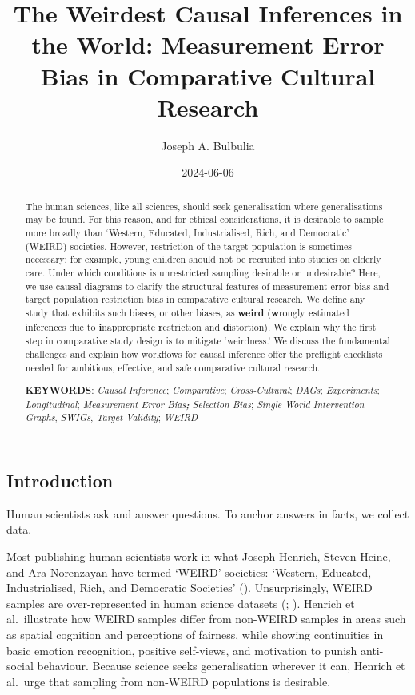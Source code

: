 \documentclass[
  single column]{article}
\title{The Weirdest Causal Inferences in the World: Measurement Error
Bias in Comparative Cultural Research}
\author{Joseph A. Bulbulia}
\affil{%
             \small{     Victoria University of Wellington, New Zealand
          ORCID \textcolor[HTML]{A6CE39}{\aiOrcid} ~0000-0002-5861-2056 }
              }
\date{2024-06-06}
\begin{document}
\maketitle
\begin{abstract}
The human sciences, like all sciences, should seek generalisation where
generalisations may be found. For this reason, and for ethical
considerations, it is desirable to sample more broadly than `Western,
Educated, Industrialised, Rich, and Democratic' (WEIRD) societies.
However, restriction of the target population is sometimes necessary;
for example, young children should not be recruited into studies on
elderly care. Under which conditions is unrestricted sampling desirable
or undesirable? Here, we use causal diagrams to clarify the structural
features of measurement error bias and target population restriction
bias in comparative cultural research. We define any study that exhibits
such biases, or other biases, as \textbf{weird} (\textbf{w}rongly
\textbf{e}stimated inferences due to \textbf{i}nappropriate
\textbf{r}estriction and \textbf{d}istortion). We explain why the first
step in comparative study design is to mitigate `weirdness.' We discuss
the fundamental challenges and explain how workflows for causal
inference offer the preflight checklists needed for ambitious,
effective, and safe comparative cultural research.

\textbf{KEYWORDS}: \emph{Causal Inference}; \emph{Comparative};
\emph{Cross-Cultural}; \emph{DAGs}; \emph{Experiments};
\emph{Longitudinal}; \emph{Measurement Error Bias\textbf{; }Selection
Bias}; \emph{Single World Intervention Graphs}, \emph{SWIGs},
\emph{Target Validity}; \emph{WEIRD}
\end{abstract}

\subsection{Introduction}\label{id-sec-intro}

Human scientists ask and answer questions. To anchor answers in facts,
we collect data.

Most publishing human scientists work in what Joseph Henrich, Steven
Heine, and Ara Norenzayan have termed `WEIRD' societies: `Western,
Educated, Industrialised, Rich, and Democratic Societies'
().
Unsurprisingly, WEIRD samples are over-represented in human science
datasets (;
). Henrich et al.~illustrate
how WEIRD samples differ from non-WEIRD samples in areas such as spatial
cognition and perceptions of fairness, while showing continuities in
basic emotion recognition, positive self-views, and motivation to punish
anti-social behaviour. Because science seeks generalisation wherever it
can, Henrich et al.~urge that sampling from non-WEIRD populations is
desirable.
\end{document}
